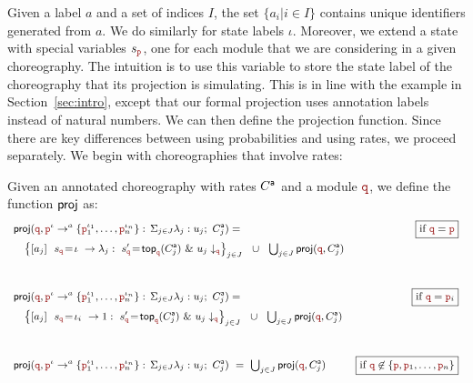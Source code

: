Given a label $a$ and a set of indices $I$, the set $\{a_i|i\in I\}$
contains unique identifiers generated from $a$.  We do similarly for
state labels $\iota$. Moreover, we extend a state with special
variables $s_{\nr}$, one for each module that we are considering in a
given choreography.
%
The intuition is to use this variable to store the state label of the
choreography that its projection is simulating. This is in line with
the example in Section~\ref{sec:intro}, except that our formal
projection uses annotation labels instead of natural numbers.
%
We can then define the projection function. Since there are key
differences between using probabilities and using rates, we proceed
separately. We begin with choreographies that involve rates:
% 
\begin{definition}\label{def:projCTMC} Given
  an annotated choreography with rates ${C}^{\mathsf a}$ and a module
  $\nrr$, %
  we define the function $\mathsf{proj}$ as:
  \begin{displaymath}\small
    \begin{array}{lr}
      \proj
      (\nrr,\interactl{\nr^{\iota}}{a}{\nr_1^{\iota_1},\ldots,\nr_n^{\iota_n}})= 
      &  \boxed{\text{if }\nrr=\nr}\\[2mm]
      \quad
      \left\{\commandBase {a_j} {\ s_{\nrr}\!=\! \iota} {\lambda_j:}
      \ s_{\nrr}'\!=\! \mathsf{top}_{\nrr}(\anno{C}_j)\ 
      \&\ \projE {u_j}\nrr\right\}_{j\in J}
      \ \ \cup\ \ \bigcup_{j\in J} \proj (\nrr, \anno{C}_j)
      \\[1cm]
          
      \proj
      (\nrr,\interactl{\nr^{\iota}}{a}{\nr_1^{\iota_1},\ldots,\nr_n^{\iota_n}})=
      &  \boxed{\text{if }
        \nrr= \nr_i}\\[2mm]
      \quad
      \left\{\commandBase {a_j} {\ s_{\nrr}\!=\! \iota_i} {1:\ s_{\nrr}'\!=\!
      \mathsf{top}_{\nrr}(\anno{C}_j)
      }
      \ \&\ \projE {u_j}\nrr\right\}_{j\in J}
      \ \ \cup\ \ \bigcup_{j\in J} \proj (\role q, \anno{C}_j)
      \\[1cm]
      
      \proj
      (\nrr,\interactl{\nr^\iota}a{\nr_1^{\iota_1},\ldots,\nr_n^{\iota_n}})\ =
      \ \bigcup_{j\in J} \proj (\role q, \anno{C}_j)
      &  \boxed{\text{if }\role q\not\in\{\role p, 
        \nr_1,\ldots,\nr_n\}}
      \\[1cm]


\end{array}
\end{displaymath}
\end{definition}
